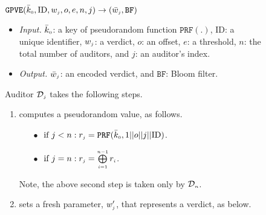 \begin{figure}[!htb]%
\setlength{\fboxsep}{1pt}
\begin{center}
    \begin{tcolorbox}[enhanced,width=5.5in,
    drop fuzzy shadow southwest,
    colframe=black,colback=white]
    \vspace{-1.5mm}

\underline{$\mathtt{GPVE}(\bar{k}_{\scriptscriptstyle 0}, \text{ID},  w_{\scriptscriptstyle j}, o, e, n,  j)\rightarrow  (\bar{  w}_{\scriptscriptstyle j}, \mathtt{BF})$}\\
%
\begin{itemize}
\item \noindent\textit{Input.} $\bar{k}_{\scriptscriptstyle 0}$: a key of  pseudorandom function $\mathtt{PRF}(.)$, $\text{ID}$: a unique identifier, $ w_{\scriptscriptstyle j}$: a  verdict, $o$: an offset, $e$: a threshold, $n$: the total number of  auditors,  and  $j$: an auditor's index.
%
\item \noindent\textit{Output.} $\bar{  w}_{\scriptscriptstyle j}$:  an  encoded verdict, and $\mathtt{BF}$: Bloom filter.  
%
\end{itemize}
Auditor $\mathcal{D}_{\scriptscriptstyle j}$ takes the following steps.
\begin{enumerate}
%
\item\label{ZSPA:val-gen} computes a pseudorandom value, as follows. 
%
%
\begin{itemize}
%
\item[$\bullet$]$ \text{ if } j< n: r_{\scriptscriptstyle j}=\mathtt{PRF}(\bar k_{\scriptscriptstyle 0}, 1||o||j||\text{ID})$.\\
%
\hspace{1mm} 
\item [$\bullet$] $ \text{ if } j=n: r_{\scriptscriptstyle j}= \bigoplus\limits^{\scriptscriptstyle n-1}_{\scriptscriptstyle i=1} r_{\scriptscriptstyle i}$.
%
\end{itemize}
Note, the above second step is taken only by $\mathcal{D}_{\scriptscriptstyle n}$.
%
\item  sets a fresh parameter, $w'_{\scriptscriptstyle j}$, that represents a verdict, as below. 
%


\end{enumerate}
\end{tcolorbox}
\end{center}
\end{figure}

